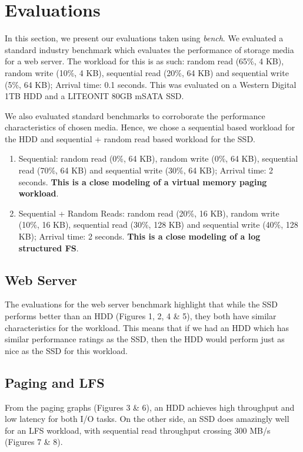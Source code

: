 \documentclass[10pt, author, twocolumn]{article}
\begin{document}
\section{Evaluations}
In this section, we present our evaluations taken using \textit{bench}. We evaluated a standard industry benchmark which evaluates the performance of storage media for a web server. The workload for this is as such: random read (65\%, 4 KB), random write (10\%, 4 KB), sequential read (20\%, 64 KB) and sequential write (5\%, 64 KB); Arrival time: 0.1 seconds. This was evaluated on a Western Digital 1TB HDD and a LITEONIT 80GB mSATA SSD.

We also evaluated standard benchmarks to corroborate the performance characteristics of chosen media. Hence, we chose a sequential based workload for the HDD and sequential + random read based workload for the SSD. 

\begin{enumerate}
    \item Sequential: random read (0\%, 64 KB), random write (0\%, 64 KB), sequential read (70\%, 64 KB) and sequential write (30\%, 64 KB); Arrival time: 2 seconds. \textbf{This is a close modeling of a virtual memory paging workload}.
    \item Sequential + Random Reads: random read (20\%, 16 KB), random write (10\%, 16 KB), sequential read (30\%, 128 KB) and sequential write (40\%, 128 KB); Arrival time: 2 seconds. \textbf{This is a close modeling of a log structured FS}.
\end{enumerate}

\subsection{Web Server}
The evaluations for the web server benchmark highlight that while the SSD performs better than an HDD (Figures 1, 2, 4 \& 5), they both have similar characteristics for the workload. This means that if we had an HDD which has similar performance ratings as the SSD, then the HDD would perform just as nice as the SSD for this workload. 

\subsection{Paging and LFS}
From the paging graphs (Figures 3 \& 6), an HDD achieves high throughput and low latency for both I/O tasks. On the other side, an SSD does amazingly well for an LFS workload, with sequential read throughput crossing 300 MB/s (Figures 7 \& 8). 
\end{document}

